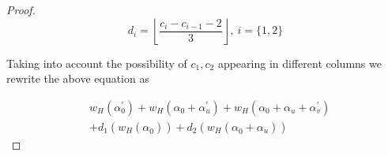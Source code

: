 \documentclass[fontsize=12pt]{article}
\theoremstyle{definition}
\begin{document}
\begin{proof}
$$d_i =\left \lfloor{\frac{c_i -c_{i-1} -2}{3}}\right \rfloor,~i=\{1,2\}$$

Taking into account the possibility of $c_1,c_2$ appearing in different columns we rewrite the above equation as 

\begin{equation}
\begin{aligned}
&w_H(\alpha^{'}_0)+w_H(\alpha_0+\alpha^{'}_u)+w_H(\alpha_0+\alpha^{}_u
+\alpha^{'}_v)\\
&+d_1\left(w_H(\alpha^{}_0)\right)+d_2\left(w_H(\alpha^{}_0 + \alpha^{}_u)\right)
\end{aligned}
\end{equation}


\end{proof}
\end{document}
